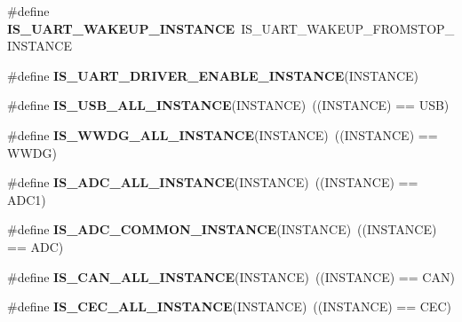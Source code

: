 \begin{DoxyCompactItemize}
\mbox{\label{group___exported__macro_ga69e32d838272d886316fcfa378605ed0}} 
\#define {\bfseries I\+S\+\_\+\+U\+A\+R\+T\+\_\+\+W\+A\+K\+E\+U\+P\+\_\+\+I\+N\+S\+T\+A\+N\+CE}~I\+S\+\_\+\+U\+A\+R\+T\+\_\+\+W\+A\+K\+E\+U\+P\+\_\+\+F\+R\+O\+M\+S\+T\+O\+P\+\_\+\+I\+N\+S\+T\+A\+N\+CE
\item 
\#define {\bfseries I\+S\+\_\+\+U\+A\+R\+T\+\_\+\+D\+R\+I\+V\+E\+R\+\_\+\+E\+N\+A\+B\+L\+E\+\_\+\+I\+N\+S\+T\+A\+N\+CE}(I\+N\+S\+T\+A\+N\+CE)
\item 
\mbox{\label{group___exported__macro_ga763f287042e73e61b91e12bb065777cd}} 
\#define {\bfseries I\+S\+\_\+\+U\+S\+B\+\_\+\+A\+L\+L\+\_\+\+I\+N\+S\+T\+A\+N\+CE}(I\+N\+S\+T\+A\+N\+CE)~((I\+N\+S\+T\+A\+N\+CE) == U\+SB)
\item 
\mbox{\label{group___exported__macro_gac2a8aaec233e19987232455643a04d6f}} 
\#define {\bfseries I\+S\+\_\+\+W\+W\+D\+G\+\_\+\+A\+L\+L\+\_\+\+I\+N\+S\+T\+A\+N\+CE}(I\+N\+S\+T\+A\+N\+CE)~((I\+N\+S\+T\+A\+N\+CE) == W\+W\+DG)
\item 
\mbox{\label{group___exported__macro_ga2204b62b378bcf08b3b9006c184c7c23}} 
\#define {\bfseries I\+S\+\_\+\+A\+D\+C\+\_\+\+A\+L\+L\+\_\+\+I\+N\+S\+T\+A\+N\+CE}(I\+N\+S\+T\+A\+N\+CE)~((I\+N\+S\+T\+A\+N\+CE) == A\+D\+C1)
\item 
\mbox{\label{group___exported__macro_gad8a5831c786b6b265531b890a194cbe2}} 
\#define {\bfseries I\+S\+\_\+\+A\+D\+C\+\_\+\+C\+O\+M\+M\+O\+N\+\_\+\+I\+N\+S\+T\+A\+N\+CE}(I\+N\+S\+T\+A\+N\+CE)~((I\+N\+S\+T\+A\+N\+CE) == A\+DC)
\item 
\mbox{\label{group___exported__macro_ga974dd363bcb2a5f48ec032509fd4ece3}} 
\#define {\bfseries I\+S\+\_\+\+C\+A\+N\+\_\+\+A\+L\+L\+\_\+\+I\+N\+S\+T\+A\+N\+CE}(I\+N\+S\+T\+A\+N\+CE)~((I\+N\+S\+T\+A\+N\+CE) == C\+AN)
\item 
\mbox{\label{group___exported__macro_ga10cad35fdea5ffcb9f17973ce98c7dee}} 
\#define {\bfseries I\+S\+\_\+\+C\+E\+C\+\_\+\+A\+L\+L\+\_\+\+I\+N\+S\+T\+A\+N\+CE}(I\+N\+S\+T\+A\+N\+CE)~((I\+N\+S\+T\+A\+N\+CE) == C\+EC)
\item 

\end{DoxyCompactItemize}
